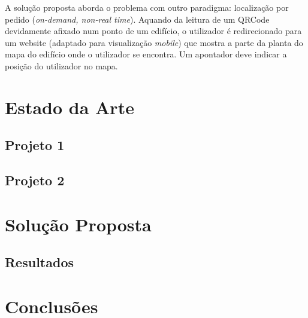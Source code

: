 \documentclass[twocolumn,twoside,11pt]{article}
\begin{document}
  A solução proposta aborda o problema com outro paradigma: localização por pedido (\emph{on-demand, non-real time}).
  Aquando da leitura de um QRCode devidamente afixado num ponto de um edifício, o utilizador é redirecionado para um website (adaptado para visualização \emph{mobile}) que mostra a parte da planta do mapa do edifício onde o utilizador se encontra.
  Um apontador deve indicar a posição do utilizador no mapa.
  


\section{Estado da Arte} %
\label{sec:state_of_the_art}

\lipsum[3]


\subsection{Projeto 1} %
\label{sub:projeto_1}
\lipsum[2]


\subsection{Projeto 2} %
\label{sub:projeto_2}
\lipsum[7]




\section{Solução Proposta} %
\label{sec:solucao}

\lipsum[8]

\subsection{Resultados} %
\label{sub:resultados}
\lipsum[3]



\section{Conclusões}\label{sec:conclusions}

\lipsum[8]


\renewcommand{\bibname}{Referências}
%
%

%


\end{document}
